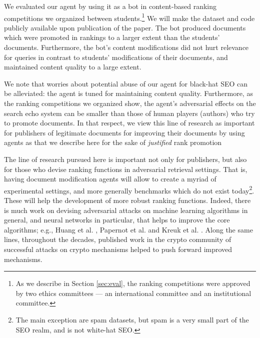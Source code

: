 We evaluated our agent by using it as a bot
in content-based ranking competitions we organized between students.\footnote{As we describe in Section \ref{sec:eval}, the ranking competitions were approved by two ethics committees --- an international committee and an institutional committee.}
We will make the dataset and code publicly available upon publication
of the paper. The bot produced documents which were promoted in
rankings to a larger extent than the students' documents. Furthermore,
the bot's content modifications did not hurt relevance for queries in
contrast to students' modifications of their documents, and maintained
content quality to a large extent.






We note that worries about potential abuse of our agent for black-hat
SEO can be alleviated: the agent is tuned for maintaining content
quality. Furthermore, as the ranking competitions we organized show, the agent's
adversarial effects on the search echo system can be smaller than
those of human players (authors) who try to promote documents. In that respect,
we view this line of research as important for publishers of
legitimate documents for improving their documents by using agents as that we describe here for the sake of {\em justified} rank promotion 

The line of research pursued here is important not only for
publishers, but also for those who devise ranking functions in
adversarial retrieval settings. That is, having document modification
agents will allow to create a myriad of experimental settings, and more
generally benchmarks which do not exist today\footnote{The main exception are spam datasets, but spam is a very small part of the SEO realm, and is not white-hat SEO.}. These will help the development of more robust ranking functions. Indeed, there is much work on devising adversarial attacks on machine learning algorithms in general, and neural networks in particular, that helps to improve the core algorithms; e.g., Huang et al. \cite{Huang+al:17a}, Papernot et al. \cite{Papernot+al:17a} and Kreuk et al. \cite{Kreuk+al:18a}. Along the same lines, throughout the decades, published work in the crypto community of successful attacks on crypto mechanisms helped to push forward improved mechanisms.

